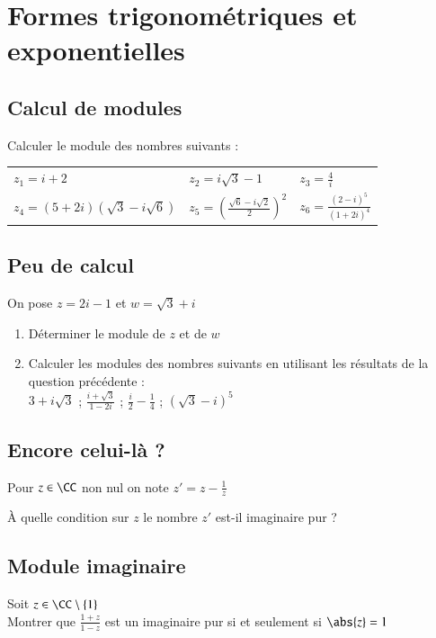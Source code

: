 \documentclass[oneside,12pt]{article}          %
\begin{document}
\section{Formes trigonométriques et exponentielles}

\subsection{Calcul de modules}
Calculer le module des nombres suivants :\\
\begin{tabular}{p{} p{} p{}}
	$z_1=i+2$ & $z_2=i\sqrt{3}-1$ & $z_3=\frac{4}{i}$ \\
    $z_4=(5+2i)(\sqrt{3}-i\sqrt{6})$ & $z_5=\left(\frac{\sqrt{6}-i\sqrt{2}}{2}\right)^2$ & $z_6=\frac{(2-i)^5}{(1+2i)^4}$
\end{tabular}



\subsection{Peu de calcul}
On pose $z=2i-1$ et $w=\sqrt{3}+i$
\begin{enumerate}
	\item Déterminer le module de $z$ et de $w$
	\item Calculer les modules des nombres suivants en utilisant les résultats de la question précédente :\\[5pt]
$3+i\sqrt{3}$ \quad\quad ; \quad $\frac{i+\sqrt{3}}{1-2i}$ \quad\quad ; \quad $\frac{i}{2}-\frac{1}{4}$ \quad\quad ; \quad $(\sqrt{3}-i)^5$ 
\end{enumerate}



\subsection{Encore celui-là ?}
Pour $z\in\CC$ non nul on note $z'=z-\frac{1}{z}$

À quelle condition sur $z$ le nombre $z'$ est-il imaginaire pur ?



\subsection{Module imaginaire}
Soit $z\in\CC\setminus\{1\}$\\
Montrer que $\frac{1+z}{1-z}$ est un imaginaire pur si et seulement si $\abs{z}=1$
\end{document}
